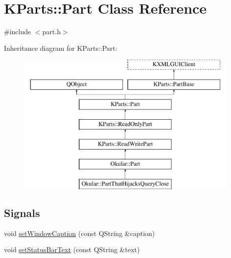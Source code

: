\hypertarget{classKParts_1_1Part}{\section{K\+Parts\+:\+:Part Class Reference}
\label{classKParts_1_1Part}
}


{\ttfamily \#include $<$part.\+h$>$}

Inheritance diagram for K\+Parts\+:\+:Part\+:\begin{figure}[H]
\begin{center}
\leavevmode
\includegraphics[height=7.000000cm]{classKParts_1_1Part}
\end{center}
\end{figure}
\subsection*{Signals}
\begin{DoxyCompactItemize}
\item 
void \hyperlink{classKParts_1_1Part_a00982292ef3d8b80dedeb5fed2376099}{set\+Window\+Caption} (const Q\+String \&caption)
\item 
void \hyperlink{classKParts_1_1Part_a809740a79edf0fa0bbe1dd982a6c4d35}{set\+Status\+Bar\+Text} (const Q\+String \&text)
\end{DoxyCompactItemize}
